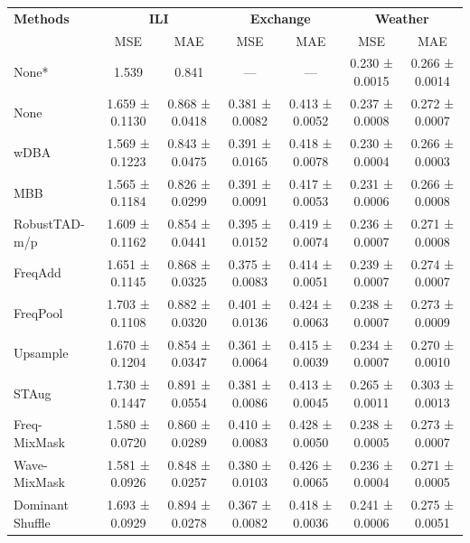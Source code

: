 \begin{table}[h!]
\centering
\vspace{0.2cm}
\renewcommand{\arraystretch}{1.2}
\begin{adjustbox}{max width=\textwidth}
\begin{tabular}{l|cc|cc|cc}
    \toprule
    \textbf{Methods} & \multicolumn{2}{c|}{\textbf{ILI}} & \multicolumn{2}{c|}{\textbf{Exchange}} & \multicolumn{2}{c}{\textbf{Weather}} \\
    & MSE & MAE & MSE & MAE & MSE & MAE \\
    \midrule
    None* & 1.539 & 0.841 & --- & --- & 0.230 ± 0.0015 & 0.266 ± 0.0014 \\
            None         &  1.659 ± 0.1130 & 0.868 ± 0.0418 & 0.381 ± 0.0082 & 0.413 ± 0.0052 & 0.237 ± 0.0008 & 0.272 ± 0.0007 \\
        wDBA         & 1.569 ± 0.1223 & 0.843 ± 0.0475 & 0.391 ± 0.0165 & 0.418 ± 0.0078 & \cellcolor{secondcolor}0.230 ± 0.0004 & \cellcolor{secondcolor}0.266 ± 0.0003 \\
        MBB          & \cellcolor{secondcolor}1.565 ± 0.1184 & \cellcolor{secondcolor}0.826 ± 0.0299 & 0.391 ± 0.0091 & 0.417 ± 0.0053 & 0.231 ± 0.0006 & 0.266 ± 0.0008 \\
        RobustTAD-m/p   & 1.609 ± 0.1162 & 0.854 ± 0.0441 & 0.395 ± 0.0152 & 0.419 ± 0.0074 & 0.236 ± 0.0007 & 0.271 ± 0.0008 \\
        FreqAdd       & 1.651 ± 0.1145 & 0.868 ± 0.0325 & 0.375 ± 0.0083 & 0.414 ± 0.0051 & 0.239 ± 0.0007 & 0.274 ± 0.0007 \\
        FreqPool      & 1.703 ± 0.1108 & 0.882 ± 0.0320 & 0.401 ± 0.0136 & 0.424 ± 0.0063 & 0.238 ± 0.0007 & 0.273 ± 0.0009 \\
        Upsample      & 1.670 ± 0.1204 & 0.854 ± 0.0347 & \cellcolor{secondcolor}0.361 ± 0.0064 & 0.415 ± 0.0039 & 0.234 ± 0.0007 & 0.270 ± 0.0010 \\
        STAug         & 1.730 ± 0.1447 & 0.891 ± 0.0554 & 0.381 ± 0.0086 &  \cellcolor{secondcolor}0.413 ± 0.0045 & 0.265 ± 0.0011 & 0.303 ± 0.0013 \\
        Freq-MixMask & 1.580 ± 0.0720 & 0.860 ± 0.0289 & 0.410 ± 0.0083 & 0.428 ± 0.0050 & 0.238 ± 0.0005 & 0.273 ± 0.0007 \\
        Wave-MixMask  & 1.581 ± 0.0926 & 0.848 ± 0.0257 & 0.380 ± 0.0103 & 0.426 ± 0.0065 & 0.236 ± 0.0004 & 0.271 ± 0.0005 \\
        Dominant Shuffle  & 1.693 ± 0.0929 & 0.894 ± 0.0278 & 0.367 ± 0.0082 & 0.418 ± 0.0036 & 0.241 ± 0.0006 & 0.275 ± 0.0051 \\

\end{tabular}
\end{adjustbox}
\end{table}
